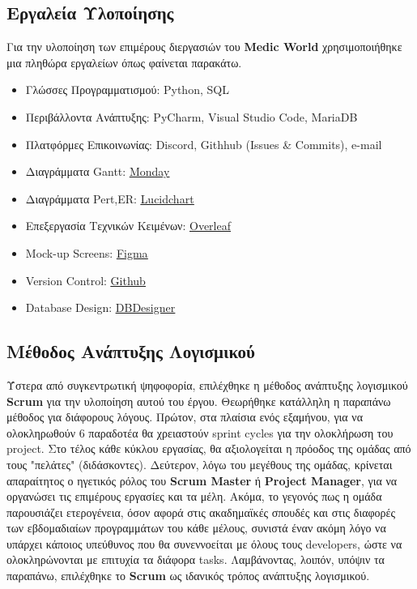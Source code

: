 \documentclass{article}
\begin{document}
\subsection{Εργαλεία Υλοποίησης}

Για την υλοποίηση των επιμέρους διεργασιών του \textbf{Medic World} χρησιμοποιήθηκε μια πληθώρα εργαλείων όπως φαίνεται παρακάτω.


\begin{itemize}
    \item Γλώσσες Προγραμματισμού: Python, SQL
    \item Περιβάλλοντα Ανάπτυξης: PyCharm, Visual Studio Code, MariaDB
    \item Πλατφόρμες Επικοινωνίας: Discord, Githhub (Issues \& Commits), e-mail
    \item Διαγράμματα Gantt: \underline{\href{https://www.monday.com}{Monday}}
    \item Διαγράμματα Pert,ER: \underline{\href{https://lucid.app}{Lucidchart}}
    \item Επεξεργασία Τεχνικών Κειμένων: \underline{\href{https://www.overleaf.com}{Overleaf}}
    \item Mock-up Screens: \underline{\href{https://www.figma.com}{Figma}}
    \item Version Control: \underline{\href{https://github.com/}{Github}}
    \item Database Design: \underline{\href{www.dbdesigner.net}{DBDesigner}}
\end{itemize}
 

\subsection{Μέθοδος Ανάπτυξης Λογισμικού}

Ύστερα από συγκεντρωτική ψηφοφορία, επιλέχθηκε η μέθοδος ανάπτυξης λογισμικού \textbf{Scrum} για την υλοποίηση αυτού του έργου. Θεωρήθηκε κατάλληλη η παραπάνω μέθοδος για διάφορους λόγους. Πρώτον, στα πλαίσια ενός εξαμήνου, για να ολοκληρωθούν 6 παραδοτέα θα χρειαστούν sprint cycles για την ολοκλήρωση του project. Στο τέλος κάθε κύκλου εργασίας, θα αξιολογείται η πρόοδος της ομάδας από τους "πελάτες" (διδάσκοντες). Δεύτερον, λόγω του μεγέθους της ομάδας, κρίνεται απαραίτητος ο ηγετικός ρόλος του \textbf{Scrum Master} ή \textbf{Project Manager}, για να οργανώσει τις επιμέρους εργασίες και τα μέλη. Ακόμα, το γεγονός πως η ομάδα παρουσιάζει ετερογένεια, όσον αφορά στις ακαδημαϊκές σπουδές και στις διαφορές των εβδομαδιαίων προγραμμάτων του κάθε μέλους, συνιστά έναν ακόμη λόγο να υπάρχει κάποιος υπεύθυνος που θα συνεννοείται με όλους τους developers, ώστε να ολοκληρώνονται με επιτυχία τα διάφορα tasks. Λαμβάνοντας, λοιπόν, υπόψιν τα παραπάνω, επιλέχθηκε το \textbf{Scrum} ως ιδανικός τρόπος ανάπτυξης λογισμικού.
\end{document}
